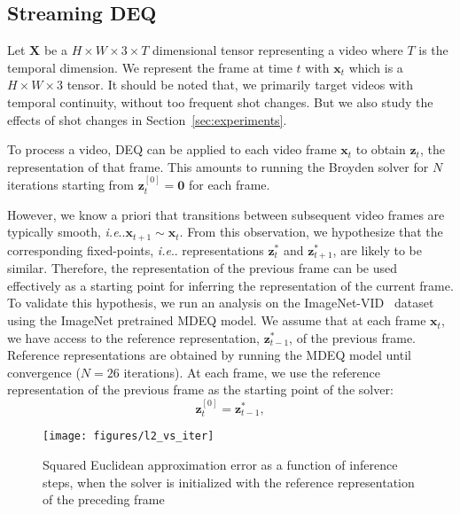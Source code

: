 \documentclass[runningheads]{llncs}
\makeatletter
\DeclareRobustCommand\onedot{\futurelet\@let@token\@onedot}
\def\@onedot{\ifx\@let@token.\else.\null\fi\xspace}
\def\ie{\emph{i.e}\onedot} \def\Ie{\emph{I.e}\onedot}
\makeatother
\begin{document}
\subsection{Streaming DEQ}


Let $\mathbf{X}$ be a ${H \times W \times 3 \times T}$ dimensional tensor representing a video where $T$ is the temporal dimension. We represent the frame at time $t$ with $\mathbf{x}_t$ which is a $H \times W \times 3$ tensor. It should be noted that, we primarily target videos with temporal continuity, without too frequent shot changes. But we also study the effects of shot changes in Section~\ref{sec:experiments}. 


To process a video, DEQ can be applied to each video frame $\mathbf{x}_t$ to obtain $\mathbf{z}_t$, the representation of that frame. This amounts to running the Broyden solver for $N$ iterations starting from $\mathbf{z}_t^{[0]}=\mathbf{0}$ for each frame. 


However, we know a priori that transitions between subsequent video frames are typically smooth, \ie $\mathbf{x}_{t+1} \sim \mathbf{x}_t$. From this observation, we hypothesize that the corresponding fixed-points, \ie representations $\mathbf{z}_t^{*}$ and $\mathbf{z}_{t+1}^{*}$, are likely to be similar. Therefore, the representation of the previous frame can be used effectively as a starting point for inferring the representation of the current frame. To validate this hypothesis, we run an analysis on the ImageNet-VID~\cite{imagenetviddataset} dataset using the ImageNet pretrained MDEQ model. We assume that at each frame $\mathbf{x}_t$, we have access to the reference representation, $\mathbf{z}_{t-1}^*$, of the previous frame. Reference representations are obtained by running the MDEQ model until convergence ($N=26$ iterations). At each frame, we use the reference representation of the previous frame as the starting point of the solver: 
\begin{equation}
    \mathbf{z}_t^{[0]} = \mathbf{z}_{t-1}^* , \label{eq:model1}
\end{equation}



\begin{wrapfigure}[17]{R}{0.48\textwidth}
    \texttt{[image: figures/l2\_vs\_iter]}
  \caption{Squared Euclidean approximation error as a function of inference steps, when the solver is initialized with the reference representation of the preceding frame\label{fig:l2vsiter}}
\end{wrapfigure}
\end{document}

